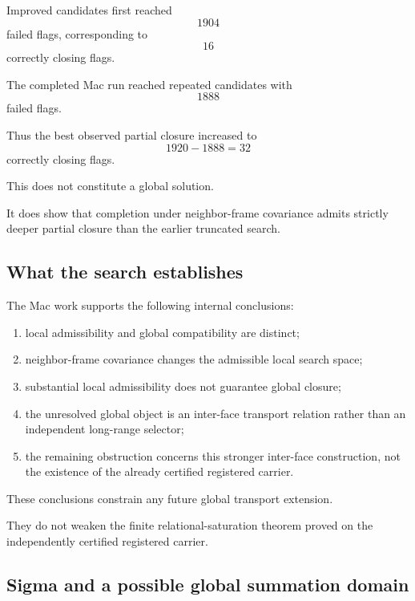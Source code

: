 Improved candidates first reached
\[
1904
\]
failed flags, corresponding to
\[
16
\]
correctly closing flags.

The completed Mac run reached repeated candidates with
\[
1888
\]
failed flags.

Thus the best observed partial closure increased to
\[
1920-1888=32
\]
correctly closing flags.

This does not constitute a global solution.

It does show that completion under neighbor-frame covariance admits
strictly deeper partial closure than the earlier truncated search.

\subsection{What the search establishes}

The Mac work supports the following internal conclusions:

\begin{enumerate}[label=(\roman*)]

\item local admissibility and global compatibility are distinct;

\item neighbor-frame covariance changes the admissible local search
space;

\item substantial local admissibility does not guarantee global
closure;

\item the unresolved global object is an inter-face transport
relation rather than an independent long-range selector;

\item the remaining obstruction concerns this stronger inter-face
construction, not the existence of the already certified registered
carrier.

\end{enumerate}

These conclusions constrain any future global transport extension.

They do not weaken the finite relational-saturation theorem proved on
the independently certified registered carrier.

\subsection{Sigma and a possible global summation domain}

